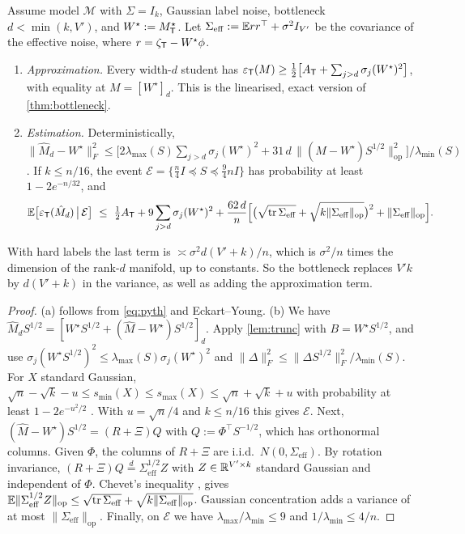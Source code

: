 \begin{theorem}\label{thm:rrr}
\Mo\Ck Assume model $\mathcal M$ with $\Sigma=I_k$, Gaussian label noise, bottleneck $d<\min(k,V')$, and $W^\star:=M^\star_{\mathsf{T}}$. Let
$\Sigma_{\mathrm{eff}}:=\mathbb{E} r r^\top+\sigma^2I_{V'}$ be the covariance of the effective noise, where $r=\zeta_{\mathsf{T}}-W^\star\phi$.
\begin{enumerate}[label=(\alph*),nosep,leftmargin=*]
\item \emph{Approximation.} Every width-$d$ student has $\varepsilon_{\mathsf{T}}(M)\ge\frac12\big[A_{\mathsf{T}}+\sum_{j>d}\sigma_j(W^\star)^2\big]$, with equality at
$M=[W^\star]_d$. This is the linearised, exact version of \cref{thm:bottleneck}.
\item \emph{Estimation.} Deterministically,
$\|\hat M_d-W^\star\|_F^2\le\big[2\lambda_{\max}(S)\sum_{j>d}\sigma_j(W^\star)^2+31\,d\,\|(\hat M-W^\star)S^{1/2}\|_{\mathrm{op}}^2\big]/\lambda_{\min}(S)$.
If $k\le n/16$, the event $\mathcal E=\{\frac n4I\preceq S\preceq\frac94nI\}$ has probability at least $1-2e^{-n/32}$, and
\[
\E\big[\eps_\TT(\hat M_d)\,\big|\,\mathcal E\big]\ \le\ \tfrac12A_\TT+9\sum_{j>d}\sigma_j(W^\star)^2+\frac{62\,d}{n}\Big[\big(\sqrt{\tr\Sigma_{\mathrm{eff}}}+\sqrt{k\|\Sigma_{\mathrm{eff}}\|_{\mathrm{op}}}\big)^2+\|\Sigma_{\mathrm{eff}}\|_{\mathrm{op}}\Big].
\]
\end{enumerate}
With hard labels the last term is $\asymp\sigma^2d(V'+k)/n$, which is $\sigma^2/n$ times the dimension of the
rank-$d$ manifold, up to constants. So the bottleneck replaces $V'k$ by $d(V'+k)$ in the variance, as well
as adding the approximation term.
\end{theorem}
\begin{proof}
(a) follows from \eqref{eq:pyth} and Eckart--Young. (b) We have $\hat M_dS^{1/2}=[W^\star S^{1/2}+(\hat M-W^\star)S^{1/2}]_d$. Apply
\cref{lem:trunc} with $B=W^\star S^{1/2}$, and use $\sigma_j(W^\star S^{1/2})^2\le\lambda_{\max}(S)\sigma_j(W^\star)^2$ and
$\|\Delta\|_F^2\le\|\Delta S^{1/2}\|_F^2/\lambda_{\min}(S)$. For $X$ standard Gaussian, $\sqrt n-\sqrt k-u\le s_{\min}(X)\le s_{\max}(X)\le\sqrt n+\sqrt k+u$
with probability at least $1-2e^{-u^2/2}$ \citep{davidson2001local}. With $u=\sqrt n/4$ and $k\le n/16$ this gives $\mathcal E$.
Next, $(\hat M-W^\star)S^{1/2}=(R+\Xi)Q$ with $Q:=\Phi^\top S^{-1/2}$, which has orthonormal columns. Given $\Phi$, the columns of
$R+\Xi$ are i.i.d.\ $N(0,\Sigma_{\mathrm{eff}})$. By rotation invariance, $(R+\Xi)Q\overset d=\Sigma_{\mathrm{eff}}^{1/2}Z$ with $Z\in\mathbb{R}^{V'\times k}$ standard
Gaussian and independent of $\Phi$. Chevet's inequality \citep{chevet1978series}, \citep[\S8.7]{vershynin2018high} gives
$\mathbb{E}\|\Sigma_{\mathrm{eff}}^{1/2}Z\|_{\mathrm{op}}\le\sqrt{\operatorname{tr}\Sigma_{\mathrm{eff}}}+\sqrt{k\|\Sigma_{\mathrm{eff}}\|_{\mathrm{op}}}$. Gaussian concentration adds a variance of at most
$\|\Sigma_{\mathrm{eff}}\|_{\mathrm{op}}$. Finally, on $\mathcal E$ we have $\lambda_{\max}/\lambda_{\min}\le9$ and $1/\lambda_{\min}\le4/n$.
\end{proof}

